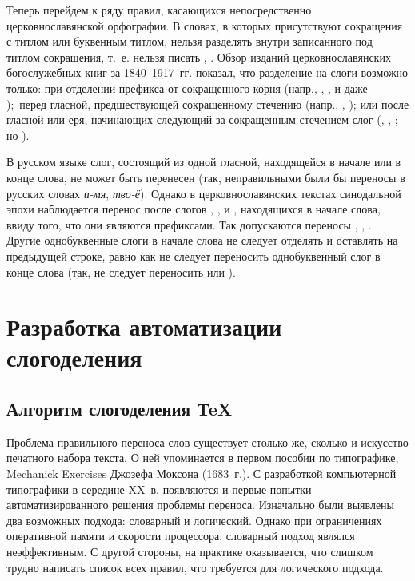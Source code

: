 \documentclass[12pt,a4paper,oneside]{extarticle}
\begin{document}
Теперь перейдем к ряду правил, касающихся непосредственно церковнославянской орфографии. В словах, в которых присутствуют сокращения с титлом или буквенным титлом, нельзя разделять внутри записанного под титлом сокращения, т.~е. нельзя писать , . Обзор изданий церковнославянских богослужебных книг за 1840--1917~гг. показал, что разделение на слоги возможно только: при отделении префикса от сокращенного корня (напр., , ,  и даже ); перед гласной, предшествующей сокращенному стечению (напр., , ); или после гласной или еря, начинающих следующий за сокращенным стечением слог (, , ; но ).

В русском языке слог, состоящий из одной гласной, находящейся в начале или в конце слова, не может быть перенесен (так, неправильными были бы переносы в русских словах \emph{и-мя}, \emph{тво-ё}). Однако в церковнославянских текстах синодальной эпохи наблюдается перенос после слогов , , и , находящихся в начале слова, ввиду того, что они являются префиксами. Так допускаются переносы , , .  Другие однобуквенные слоги в начале слова не следует отделять и оставлять на предыдущей строке, равно как не следует переносить однобуквенный слог в конце слова (так, не следует переносить  или ).

\section{Разработка автоматизации слогоделения}

\subsection{Алгоритм слогоделения \TeX{}}

Проблема правильного переноса слов существует столько же, сколько и искусство печатного набора текста. О ней упоминается в первом пособии по типографике, \textenglish{Mechanick Exercises} Джозефа Моксона (1683~г.). С разработкой компьютерной типографики в середине XX~в. появляются и первые попытки автоматизированного решения проблемы переноса. Изначально были выявлены два возможных подхода: словарный и логический. Однако при ограничениях оперативной памяти и скорости процессора, словарный подход являлся неэффективным. С другой стороны, на практике оказывается, что слишком трудно написать список всех правил, что требуется для логического подхода.
\end{document}
